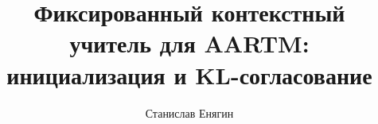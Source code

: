 \documentclass[10pt,a4paper]{article}
\title{Фиксированный контекстный учитель для AARTM:\\инициализация и KL-согласование}
\author{Станислав Енягин}
\date{}
\begin{document}
\maketitle
\begin{abstract}

\end{abstract}




\FloatBarrier
\begingroup
\footnotesize


\endgroup
\end{document}
